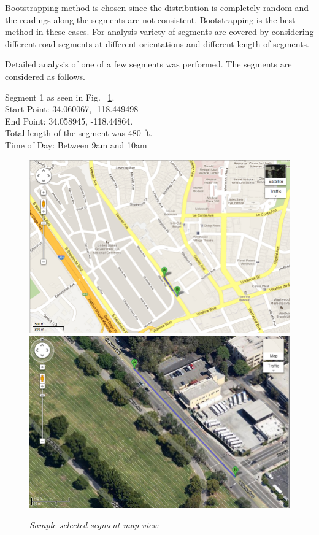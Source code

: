 \documentclass[12pt,fullpage,doublespace]{article}
\begin{document}
Bootstrapping method is chosen since the distribution is completely random and the readings along the segments are not consistent. Bootstrapping is the best method in these cases. For analysis variety of segments are covered by considering different road segments at different orientations and different length of segments. 

\newpage
Detailed analysis of one of a few segments was performed. The segments are considered as follows.
\begin{center}
Segment 1 as seen in Fig. ~\ref{fig:veteranSatellite}. \\
Start Point:  34.060067, -118.449498\\
End Point:  34.058945, -118.44864. \\
Total length of the segment was 480 ft.\\
Time of Day: Between 9am and 10am\\
\begin{figure}[h]
\begin{center}
\includegraphics[scale=0.32]{veteranMap.png}
\includegraphics[scale=0.32]{veteranSatellite.png}
\caption{\small \sl Sample selected segment map view}\label{fig:veteranSatellite}
\end{center}
\end{figure}
\end{center}
\end{document}
